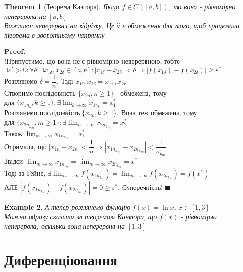\documentclass[a4paper, 14pt]{extarticle}
\def\huge{\displaystyle}
\theoremstyle{theoremdd}
\newtheorem{theorem}{Theorem}[subsection]
\theoremstyle{theoremdd}
\theoremstyle{theoremdd}
\theoremstyle{theoremdd}
\newtheorem{example}[theorem]{Example}
\theoremstyle{theoremdd}
\theoremstyle{theoremdd}
\theoremstyle{theoremdd}
\theoremstyle{theoremdd}
\newenvironment{pf}{\vspace*{-3mm} \textbf{Proof. \\}}{$\blacksquare$}
\begin{document}
\begin{theorem}[Теорема Кантора]
Якщо $f \in C([a,b])$, то вона - рівномірно неперервна на $[a,b]$\\
Важливо: неперервна на відрізку. Це й є обмеження для того, щоб працювала теорема в зворотньому напрямку
\end{theorem}

\begin{pf}
!Припустимо, що вона не є рівномірно неперервною, тобто\\
$\exists \varepsilon^* > 0: \forall \delta: \exists x_{1 \delta}, x_{2 \delta} \in [a,b]: |x_{1 \delta} - x_{2 \delta}| < \delta \Rightarrow |f(x_{1 \delta}) - f(x_{2 \delta})| \geq \varepsilon^*$\\
Розглянемо $\delta = \dfrac{1}{n}$. Тоді $x_{1 \delta}, x_{2 \delta} = x_{1n}, x_{2n}$\\
Створимо послідовність $\{x_{1n}, n \geq 1\}$ - обмежена, тому \\ 
для $\{x_{{1n}_k}, k \geq 1\}: \exists \huge \lim_{k \to \infty} x_{{1n}_k} = x_1^*$\\
Розглянемо послідовність $\{x_{2k}, k \geq 1\}$. Вона теж обмежена, тому \\
для $\{x_{{{2n}_k}_m}, m \geq 1\}: \exists \huge \lim_{m \to \infty} x_{{{2n}_k}_m} = x_2^*$\\
Також $\huge \lim_{m \to \infty} x_{{{1n}_k}_m} = x_1^*$\\
Отримали, що $|x_{1n} - x_{2n}| < \dfrac{1}{n} \Rightarrow |x_{{{1n}_k}_m}-x_{{{2n}_k}_m}| < \dfrac{1}{n_{k_m}}$\\
Звідси $\huge \lim_{m \to \infty} x_{1n_{k_m}} = \lim_{m \to \infty} x_{2n_{k_m}} = x^*$\\
Тоді за Гейне, $\exists \huge \lim_{m \to \infty} f(x_{1n_{k_m}}) = \lim_{m \to \infty} f(x_{2n_{k_m}}) = f(x^*)$\\
АЛЕ $|f(x_{1n_{k_m}})-f(x_{2n_{k_m}})| = 0 \geq \varepsilon^*$. Суперечність!
\end{pf}

\begin{example}
А тепер розглянемо функцію $f(x) = \ln x$, $x \in [1,3]$\\
Можна одразу сказати за теоремою Кантора, що $f(x)$ - рівномірно неперервна, оскільки вона неперервна на $[1,3]$
\end{example}
\newpage

\section{Диференціювання}
\end{document}
